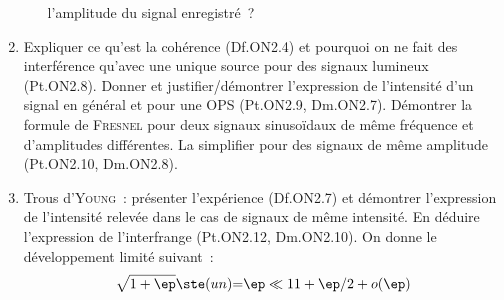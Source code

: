 \documentclass[a4paper, 12pt, final, garamond]{book}
\begin{document}
\begin{enumerate}
\begin{enumerate}[label=\sqenumi]
		            l'amplitude du signal enregistré~?
	      \end{enumerate}
	\item Expliquer ce qu'est la cohérence (Df.ON2.4) et pourquoi on ne fait des
	      interférence qu'avec une unique source pour des signaux lumineux (Pt.ON2.8).
	      Donner et justifier/démontrer l'expression de l'intensité d'un signal en
	      général et pour une OPS (Pt.ON2.9, Dm.ON2.7). Démontrer la formule de
	      \textsc{Fresnel} pour deux signaux sinusoïdaux de même fréquence et
	      d'amplitudes différentes. La simplifier pour des signaux de même
	      amplitude (Pt.ON2.10, Dm.ON2.8).
	\item Trous d'\textsc{Young}~: présenter l'expérience (Df.ON2.7) et démontrer
	      l'expression de l'intensité relevée dans le cas de signaux de même
	      intensité. En déduire l'expression de l'interfrange (Pt.ON2.12,
	      Dm.ON2.10).
	      \smallbreak
	      On donne le développement limité suivant~:
	      \[\sqrt{1+\ep} \ste(un){=}{\ep \ll 1} 1 + \ep/2 + o(\ep)\]
\end{enumerate}
\end{document}
